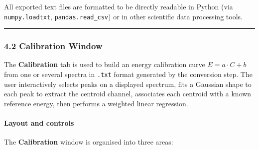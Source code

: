All exported text files are formatted to be directly readable in Python
(via \texttt{numpy.loadtxt}, \texttt{pandas.read\_csv}) or in other
scientific data processing tools.

\begin{center}\rule{0.5\linewidth}{0.5pt}\end{center}

\hypertarget{calibration-window}{%
\subsubsection{4.2 Calibration Window}\label{calibration-window}}

The \textbf{Calibration} tab is used to build an energy calibration
curve \(E = a \cdot C + b\) from one or several spectra in \texttt{.txt}
format generated by the conversion step. The user interactively selects
peaks on a displayed spectrum, fits a Gaussian shape to each peak to
extract the centroid channel, associates each centroid with a known
reference energy, then performs a weighted linear regression.

\hypertarget{layout-and-controls-1}{%
\paragraph{Layout and controls}\label{layout-and-controls-1}}

The \textbf{Calibration} window is organised into three areas:

